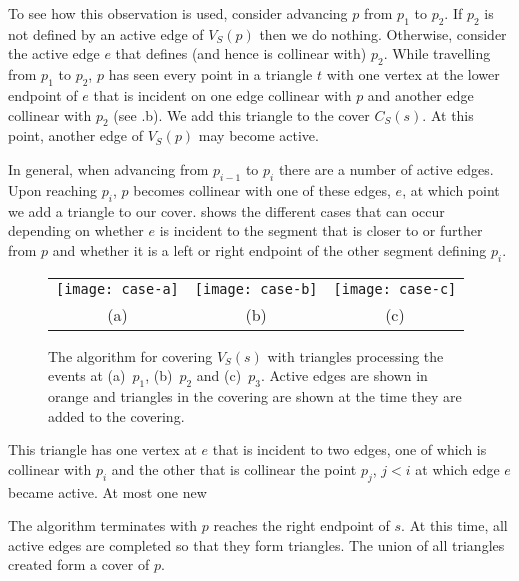 \documentclass{patmorin}
\begin{document}
To see how this observation is used, consider advancing $p$ from $p_1$ to
$p_2$.  If $p_2$ is not defined by an active edge of $V_S(p)$ then we do
nothing.  Otherwise, consider the active edge $e$ that defines (and hence
is collinear with) $p_2$.  While travelling from $p_1$ to $p_2$, $p$ has
seen every point in a triangle $t$ with one vertex at the lower endpoint of
$e$ that is incident on one edge collinear with $p$ and another edge
collinear with $p_2$ (see .b).  We add this triangle to the
cover $C_S(s)$.  At this point, another edge of $V_S(p)$ may become active.

In general, when advancing from $p_{i-1}$ to $p_{i}$ there are a number of
active edges.  Upon reaching $p_{i}$, $p$ becomes collinear with one of  
these edges, $e$, at which point we add a triangle to our cover.
 shows the different cases that can occur depending on
whether $e$ is incident to the segment that is closer to or further from $p$
and whether it is a left or right endpoint of the other segment defining
$p_i$.

\begin{figure}
  \begin{center}
    \begin{tabular}{|c|c|c|}
      \texttt{[image: case-a]} &
      \texttt{[image: case-b]} &
      \texttt{[image: case-c]} \\
      (a) & (b) & (c)
    \end{tabular}
  \end{center}
  \caption{The algorithm for covering $V_S(s)$ with triangles processing
           the events at (a)~$p_1$, (b)~$p_2$ and (c)~$p_3$.  
           Active edges are shown in orange and triangles in the covering
are shown at the time they are added to the covering.}
\end{figure}



  This
triangle has one vertex at $e$ that is incident to two edges, one of which
is collinear with $p_{i}$ and the other that is collinear the point $p_j$,
$j < i$ at which edge $e$ became active.  At most one new

The algorithm terminates with $p$ reaches the right endpoint of $s$.  At
this time, all active edges are completed so that they form triangles.  The
union of all triangles created form a cover of $p$.
\end{document}
